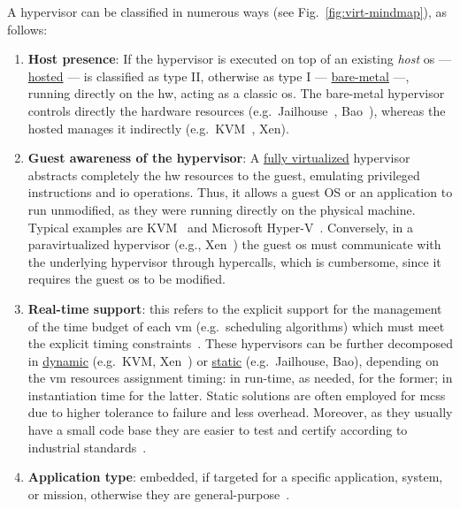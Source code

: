 A hypervisor can be classified in numerous ways (see
Fig.~\ref{fig:virt-mindmap}), as follows:
\begin{enumerate}
\item \textbf{Host presence}: If the hypervisor is executed on top of an
  existing \emph{host} \gls{os} --- \underline{hosted} --- is classified as type II,
  otherwise as type I --- \underline{bare-metal} ---, running directly on the \gls{hw},
  acting as a classic \gls{os}. The bare-metal hypervisor controls directly the
  hardware resources (e.g.~Jailhouse~\cite{jailhouse}, Bao~\cite{martins_et_al:OASIcs:2020:11779}), whereas the hosted manages it
  indirectly (e.g.~KVM~\cite{kivity2007kvm}, Xen).
\item \textbf{Guest awareness of the hypervisor}: A \underline{fully virtualized} hypervisor
  abstracts completely the \gls{hw} resources to the guest, emulating privileged
  instructions and \gls{io} operations. Thus, it allows a guest OS or an
  application to run unmodified, as they were running directly on the physical
  machine. Typical examples are KVM~\cite{kivity2007kvm} and Microsoft Hyper-V~\cite{microsoftHyperV}. Conversely, in a
  paravirtualized hypervisor (e.g., Xen~\cite{barham2003xen}) the guest \gls{os}
  must communicate with the underlying hypervisor through hypercalls, which is
  cumbersome, since it requires the guest \gls{os} to be modified.
\item \textbf{Real-time support}: this refers to the explicit support for the
  management of the time budget of each \gls{vm} (e.g.~scheduling algorithms)
  which must meet the explicit timing
  constraints~\cite{cinque2022virtualizing}. These hypervisors can be further
  decomposed in \underline{dynamic} (e.g.~KVM\cite{kivity2007kvm},
  Xen~\cite{barham2003xen}) or \underline{static} (e.g.~Jailhouse\cite{jailhouse}, Bao\cite{martins_et_al:OASIcs:2020:11779}), depending on the
  \gls{vm} resources assignment timing: in run-time, as needed, for the former;
  in instantiation time for the latter. Static solutions are often employed for
  \glspl{mcs} due to higher tolerance to failure and less overhead. Moreover, as
  they usually have a small code base they are easier to test and certify
  according to industrial standards~\cite{cinque2022virtualizing}.
\item \textbf{Application type}: embedded, if targeted for a specific application, system, or mission, otherwise they are general-purpose~\cite{heiser2008role}.
\end{enumerate}

